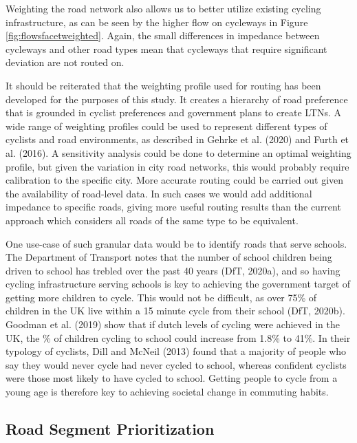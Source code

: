 \documentclass[
]{article}
\begin{document}
Weighting the road network also allows us to better utilize existing cycling infrastructure, as can be seen by the higher flow on cycleways in Figure \ref{fig:flowsfacetweighted}.
Again, the small differences in impedance between cycleways and other road types mean that cycleways that require significant deviation are not routed on.

It should be reiterated that the weighting profile used for routing has been developed for the purposes of this study.
It creates a hierarchy of road preference that is grounded in cyclist preferences and government plans to create LTNs.
A wide range of weighting profiles could be used to represent different types of cyclists and road environments, as described in Gehrke et al. (2020) and Furth et al. (2016).
A sensitivity analysis could be done to determine an optimal weighting profile, but given the variation in city road networks, this would probably require calibration to the specific city.
More accurate routing could be carried out given the availability of road-level data.
In such cases we would add additional impedance to specific roads, giving more useful routing results than the current approach which considers all roads of the same type to be equivalent.

One use-case of such granular data would be to identify roads that serve schools.
The Department of Transport notes that the number of school children being driven to school has trebled over the past 40 years (DfT, 2020a), and so having cycling infrastructure serving schools is key to achieving the government target of getting more children to cycle.
This would not be difficult, as over 75\% of children in the UK live within a 15 minute cycle from their school (DfT, 2020b).
Goodman et al. (2019) show that if dutch levels of cycling were achieved in the UK, the \% of children cycling to school could increase from 1.8\% to 41\%.
In their typology of cyclists, Dill and McNeil (2013) found that a majority of people who say they would never cycle had never cycled to school, whereas confident cyclists were those most likely to have cycled to school.
Getting people to cycle from a young age is therefore key to achieving societal change in commuting habits.

\hypertarget{road-segment-prioritization}{%
\subsection{Road Segment Prioritization}\label{road-segment-prioritization}}
\end{document}
